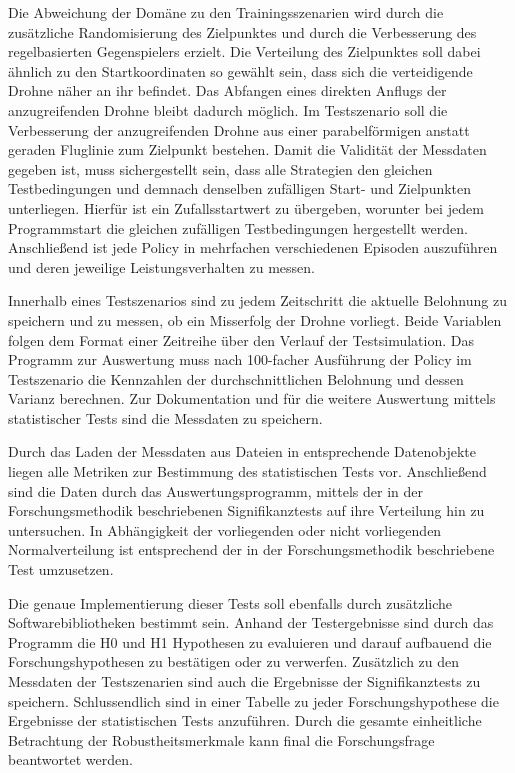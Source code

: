 Die Abweichung der Domäne zu den Trainingsszenarien wird durch die zusätzliche Randomisierung des Zielpunktes und durch die Verbesserung des regelbasierten Gegenspielers erzielt. 
Die Verteilung des Zielpunktes soll dabei ähnlich zu den Startkoordinaten so gewählt sein, dass sich die verteidigende Drohne näher an ihr befindet.
Das Abfangen eines direkten Anflugs der anzugreifenden Drohne bleibt dadurch möglich.
Im Testszenario soll die Verbesserung der anzugreifenden Drohne aus einer parabelförmigen anstatt geraden Fluglinie zum Zielpunkt bestehen.
Damit die Validität der Messdaten gegeben ist, muss sichergestellt sein, dass alle Strategien den gleichen Testbedingungen und demnach denselben zufälligen Start- und Zielpunkten unterliegen.
Hierfür ist ein Zufallsstartwert zu übergeben, worunter bei jedem Programmstart die gleichen zufälligen Testbedingungen hergestellt werden.
Anschließend ist jede Policy in mehrfachen verschiedenen Episoden auszuführen und deren jeweilige Leistungsverhalten zu messen.

Innerhalb eines Testszenarios sind zu jedem Zeitschritt die aktuelle Belohnung zu speichern und zu messen, ob ein Misserfolg der Drohne vorliegt.
Beide Variablen folgen dem Format einer Zeitreihe über den Verlauf der Testsimulation.
Das Programm zur Auswertung muss nach 100-facher Ausführung der Policy im Testszenario die Kennzahlen der durchschnittlichen Belohnung und dessen Varianz berechnen.
Zur Dokumentation und für die weitere Auswertung mittels statistischer Tests sind die Messdaten zu speichern.

Durch das Laden der Messdaten aus Dateien in entsprechende Datenobjekte liegen alle Metriken zur Bestimmung des statistischen Tests vor.
Anschließend sind die Daten durch das Auswertungsprogramm, mittels der in der Forschungsmethodik beschriebenen Signifikanztests auf ihre Verteilung hin zu untersuchen.
In Abhängigkeit der vorliegenden oder nicht vorliegenden Normalverteilung ist entsprechend der in der Forschungsmethodik beschriebene Test umzusetzen.

Die genaue Implementierung dieser Tests soll ebenfalls durch zusätzliche Softwarebibliotheken bestimmt sein.
Anhand der Testergebnisse sind durch das Programm die H0 und H1 Hypothesen zu evaluieren und darauf aufbauend die Forschungshypothesen zu bestätigen oder zu verwerfen.
Zusätzlich zu den Messdaten der Testszenarien sind auch die Ergebnisse der Signifikanztests zu speichern.
Schlussendlich sind in einer Tabelle zu jeder Forschungshypothese die Ergebnisse der statistischen Tests anzuführen.
Durch die gesamte einheitliche Betrachtung der Robustheitsmerkmale kann final die Forschungsfrage beantwortet werden.
